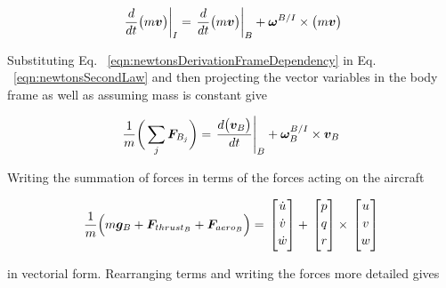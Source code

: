 \begin{equation}{\label{eqn:newtonsDerivationFrameDependency}}
\left. \frac{d}{dt} \big( m \bm{v} \big) \right|_I = \left. \frac{d}{dt} \big( m \bm{v} \big) \right|_B + \bm{\omega}^{B/I} \times \big( m\bm{v} \big)
\end{equation}

Substituting Eq. ~\ref{eqn:newtonsDerivationFrameDependency} in Eq. ~\ref{eqn:newtonsSecondLaw} and then projecting the vector variables in the body frame as well as assuming mass is constant give


 \begin{equation}{\label{eqn:newtonsSecondLaw}}
\frac{1}{m} \bigg( \sum_j \bm{F}_{B_j} \bigg)= \left. \frac{d\big(\bm{v}_B \big)}{dt}  \right|_B + \bm{\omega}_B^{B/I} \times \bm{v}_B
\end{equation}

Writing the summation of forces in terms of the forces acting on the aircraft

\begin{equation}{\label{eqn:dynamicsEquation1}}
\frac{1}{m} \Big( m \bm{g}_B + \bm{F}_{{thrust}_B} + \bm{F}_{{aero}_B} \Big)  =\,
\begin{bmatrix}
\dot{u}\\[0.2em]
\dot{v}\\[0.2em]
\dot{w}\\[0.2em]
\end{bmatrix}
+\,
\begin{bmatrix}
p\\[0.2em]
q\\[0.2em]
r\\[0.2em]
\end{bmatrix}
\times \,
\begin{bmatrix}
u\\[0.2em]
v\\[0.2em]
w\\[0.2em]
\end{bmatrix}
\end{equation}

in vectorial form. Rearranging terms and writing the forces more detailed gives 

